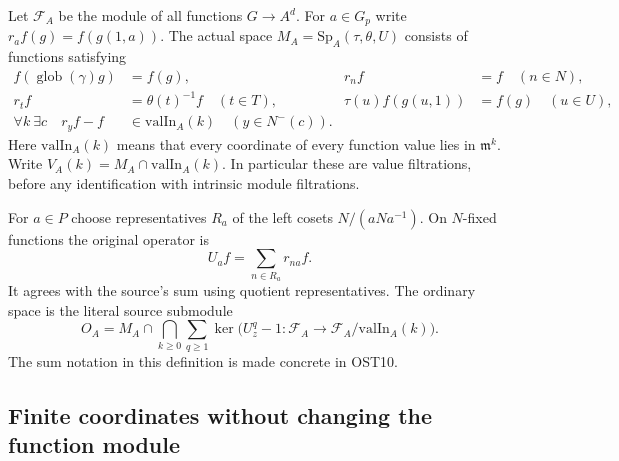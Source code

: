\documentclass[11pt,a4paper]{article}
\numberwithin{equation}{section}
\theoremstyle{remark}\newtheorem{remark}[theorem]{Remark}
\begin{document}
Let $\mathcal F_A$ be the module of all functions $G\to A^d$.
For $a\in G_p$ write $r_a f(g)=f(g(1,\allowbreak{} a))$.  The actual space
$M_A=\mathrm{Sp}_A(\tau,\theta,\allowbreak{} U)$ consists of functions satisfying
\begin{align}
 f(\operatorname{glob}(\gamma)g)&=f(g), &
 r_n f&=f\quad(n\in N),\\
 r_t f&=\theta(t)^{-1}f\quad(t\in T), &
 \tau(u)f(g(u,1))&=f(g)\quad(u\in U),\\
 \forall k\ \exists c\quad
 r_y f-f&\in\mathrm{valIn}_A(k)\quad(y\in N^-(c)).
 \label{eq:ost-space}
\end{align}
Here $\mathrm{valIn}_A(k)$ means that every coordinate of every
function value lies in $\mathfrak m^k$.  Write
$V_A(k)=M_A\cap\mathrm{valIn}_A(k)$.  In particular these
are value filtrations, before any identification with intrinsic
module filtrations.

For $a\in P$ choose representatives $R_a$ of the left cosets
$N/(aNa^{-1})$.  On $N$-fixed functions the original operator is
\begin{equation}\label{eq:ost-ua}
                 U_a f=\sum_{n\in R_a}r_{na}f.
\end{equation}
It agrees with the source's sum using quotient representatives.
The ordinary space is the literal source submodule
\begin{equation}\label{eq:ost-ord-definition}
 O_A=M_A\cap\bigcap_{k\geq0}
       \sum_{q\geq1}\ker\bigl(U_z^q-1:
                         \mathcal F_A\to\mathcal F_A/
                                      \mathrm{valIn}_A(k)\bigr).
\end{equation}
The sum notation in this definition is made concrete in OST10.

\subsection{Finite coordinates without changing the function module}

\end{document}
